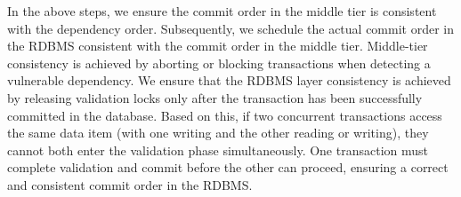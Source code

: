 In the above steps, we ensure the commit order in the middle tier is consistent with the dependency order. Subsequently, we schedule the actual commit order in the RDBMS consistent with the commit order in the middle tier. Middle-tier consistency is achieved by aborting or blocking transactions when detecting a vulnerable dependency. We ensure that the RDBMS layer consistency is achieved by releasing validation locks only after the transaction has been successfully committed in the database. Based on this, if two concurrent transactions access the same data item (with one writing and the other reading or writing), they cannot both enter the validation phase simultaneously. One transaction must complete validation and commit before the other can proceed, ensuring a correct and consistent commit order in the RDBMS.





